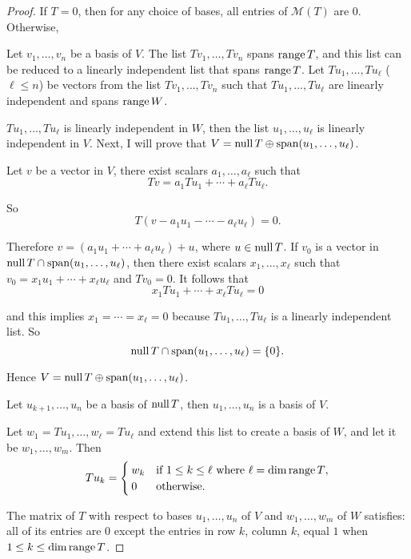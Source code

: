 \begin{proof}
    If $T = 0$, then for any choice of bases, all entries of $\mathcal{M}(T)$ are $0$. Otherwise,

    Let $v_{1}, \ldots, v_{n}$ be a basis of $V$. The list $Tv_{1}, \ldots, Tv_{n}$ spans $\text{range}\,{T}$, and this list can be reduced to a linearly independent list that spans $\text{range}\,{T}$. Let $Tu_{1}, \ldots, Tu_{\ell}$ ($\ell\leq n$) be vectors from the list $Tv_{1}, \ldots, Tv_{n}$ such that $Tu_{1}, \ldots, Tu_{\ell}$ are linearly independent and spans $\text{range}\,{W}$.

    $Tu_{1}, \ldots, Tu_{\ell}$ is linearly independent in $W$, then the list $u_{1}, \ldots, u_{\ell}$ is linearly independent in $V$. Next, I will prove that $V = \text{null}\,{T} \oplus\text{span}(u_{1}, \ldots, u_{\ell})$.

    Let $v$ be a vector in $V$, there exist scalars $a_{1}, \ldots, a_{\ell}$ such that
    \[
        Tv = a_{1}Tu_{1} + \cdots + a_{\ell}Tu_{\ell}.
    \]

    So
    \[
        T(v - a_{1}u_{1} - \cdots - a_{\ell}u_{\ell}) = 0.
    \]

    Therefore $v = (a_{1}u_{1} + \cdots + a_{\ell}u_{\ell}) + u$, where $u\in\text{null}\,{T}$. If $v_{0}$ is a vector in $\text{null}\,{T}\cap \text{span}(u_{1}, \ldots, u_{\ell})$, then there exist scalars $x_{1}, \ldots, x_{\ell}$ such that $v_{0} = x_{1}u_{1} + \cdots + x_{\ell}u_{\ell}$ and $Tv_{0} = 0$. It follows that
    \[
        x_{1}Tu_{1} + \cdots + x_{\ell}Tu_{\ell} = 0
    \]

    and this implies $x_{1} = \cdots = x_{\ell} = 0$ because $Tu_{1}, \ldots, Tu_{\ell}$ is a linearly independent list. So
    \[
        \text{null}\,{T}\cap\text{span}(u_{1}, \ldots, u_{\ell}) = \{0\}.
    \]

    Hence $V = \text{null}\,{T}\oplus\text{span}(u_{1}, \ldots, u_{\ell})$.

    Let $u_{k+1}, \ldots, u_{n}$ be a basis of $\text{null}\,{T}$, then $u_{1}, \ldots, u_{n}$ is a basis of $V$.

    Let $w_{1} = Tu_{1}, \ldots, w_{\ell} = Tu_{\ell}$ and extend this list to create a basis of $W$, and let it be $w_{1}, \ldots, w_{m}$. Then
    \[
        Tu_{k} = \begin{cases}
            w_{k} & \text{if $1\leq k\leq \ell$ where $\ell = \dim\text{range}\,{T}$}, \\
            0     & \text{otherwise}.
        \end{cases}
    \]

    The matrix of $T$ with respect to bases $u_{1}, \ldots, u_{n}$ of $V$ and $w_{1}, \ldots, w_{m}$ of $W$ satisfies: all of its entries are $0$ except the entries in row $k$, column $k$, equal $1$ when $1\leq k\leq \dim\text{range}\,{T}$.
\end{proof}
\newpage

